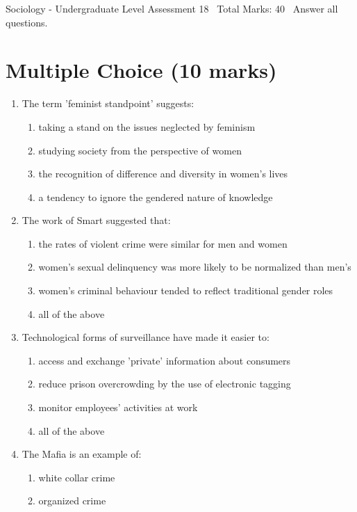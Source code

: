 \documentclass[12pt]{article}
\begin{document}
\begin{center}
Sociology - Undergraduate Level Assessment 18 \
Total Marks: 40 \
Answer all questions.
\end{center}

\section*{Multiple Choice (10 marks)}
\begin{enumerate}[label=\arabic*.]
\item The term 'feminist standpoint' suggests:
\begin{enumerate}[label=(\alph*)]
    \item taking a stand on the issues neglected by feminism
    \item studying society from the perspective of women
    \item the recognition of difference and diversity in women's lives
    \item a tendency to ignore the gendered nature of knowledge
\end{enumerate}
\item The work of Smart suggested that:
\begin{enumerate}[label=(\alph*)]
    \item the rates of violent crime were similar for men and women
    \item women's sexual delinquency was more likely to be normalized than men's
    \item women's criminal behaviour tended to reflect traditional gender roles
    \item all of the above
\end{enumerate}
\item Technological forms of surveillance have made it easier to:
\begin{enumerate}[label=(\alph*)]
    \item access and exchange 'private' information about consumers
    \item reduce prison overcrowding by the use of electronic tagging
    \item monitor employees' activities at work
    \item all of the above
\end{enumerate}
\item The Mafia is an example of:
\begin{enumerate}[label=(\alph*)]
    \item white collar crime
    \item organized crime

\end{enumerate}
\end{enumerate}
\end{document}
